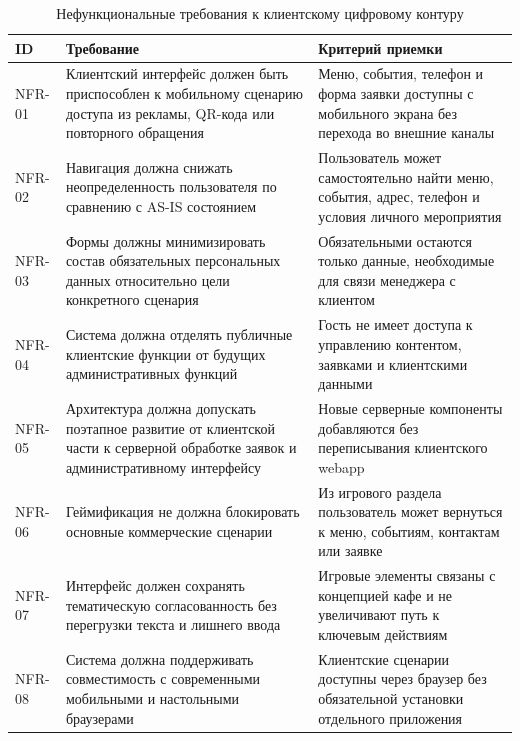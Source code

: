 \begin{table}[H]
\centering
\small
\caption{Нефункциональные требования к клиентскому цифровому контуру}
\label{tab:v2_nonfunctional_requirements}
\begin{tabularx}{\textwidth}{|>{\raggedright\arraybackslash}p{}|>{\raggedright\arraybackslash}p{}|>{\raggedright\arraybackslash}X|}
\hline
\textbf{ID} & \textbf{Требование} & \textbf{Критерий приемки} \\ \hline
NFR-01 & Клиентский интерфейс должен быть приспособлен к мобильному сценарию доступа из рекламы, QR-кода или повторного обращения & Меню, события, телефон и форма заявки доступны с мобильного экрана без перехода во внешние каналы \\ \hline
NFR-02 & Навигация должна снижать неопределенность пользователя по сравнению с AS-IS состоянием & Пользователь может самостоятельно найти меню, события, адрес, телефон и условия личного мероприятия \\ \hline
NFR-03 & Формы должны минимизировать состав обязательных персональных данных относительно цели конкретного сценария & Обязательными остаются только данные, необходимые для связи менеджера с клиентом \\ \hline
NFR-04 & Система должна отделять публичные клиентские функции от будущих административных функций & Гость не имеет доступа к управлению контентом, заявками и клиентскими данными \\ \hline
NFR-05 & Архитектура должна допускать поэтапное развитие от клиентской части к серверной обработке заявок и административному интерфейсу & Новые серверные компоненты добавляются без переписывания клиентского webapp \\ \hline
NFR-06 & Геймификация не должна блокировать основные коммерческие сценарии & Из игрового раздела пользователь может вернуться к меню, событиям, контактам или заявке \\ \hline
NFR-07 & Интерфейс должен сохранять тематическую согласованность без перегрузки текста и лишнего ввода & Игровые элементы связаны с концепцией кафе и не увеличивают путь к ключевым действиям \\ \hline
NFR-08 & Система должна поддерживать совместимость с современными мобильными и настольными браузерами & Клиентские сценарии доступны через браузер без обязательной установки отдельного приложения \\ \hline
\end{tabularx}
\normalsize
\end{table}

